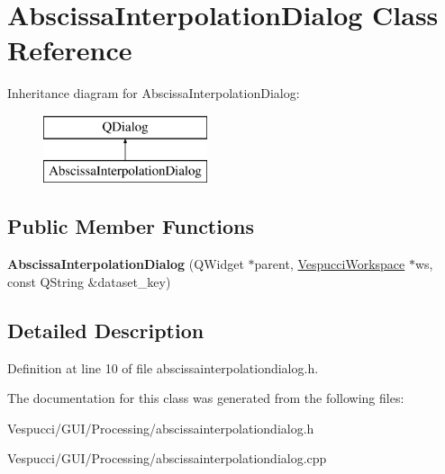 \hypertarget{class_abscissa_interpolation_dialog}{}\section{Abscissa\+Interpolation\+Dialog Class Reference}
\label{class_abscissa_interpolation_dialog}
Inheritance diagram for Abscissa\+Interpolation\+Dialog\+:\begin{figure}[H]
\begin{center}
\leavevmode
\includegraphics[height=2.000000cm]{class_abscissa_interpolation_dialog}
\end{center}
\end{figure}
\subsection*{Public Member Functions}
\begin{DoxyCompactItemize}
\item 
{\bfseries Abscissa\+Interpolation\+Dialog} (Q\+Widget $\ast$parent, \hyperlink{class_vespucci_workspace}{Vespucci\+Workspace} $\ast$ws, const Q\+String \&dataset\+\_\+key)\hypertarget{class_abscissa_interpolation_dialog_a6c5ad25cb8d3be8914bec8d9d820cf23}{}\label{class_abscissa_interpolation_dialog_a6c5ad25cb8d3be8914bec8d9d820cf23}

\end{DoxyCompactItemize}


\subsection{Detailed Description}


Definition at line 10 of file abscissainterpolationdialog.\+h.



The documentation for this class was generated from the following files\+:\begin{DoxyCompactItemize}
\item 
Vespucci/\+G\+U\+I/\+Processing/abscissainterpolationdialog.\+h\item 
Vespucci/\+G\+U\+I/\+Processing/abscissainterpolationdialog.\+cpp\end{DoxyCompactItemize}

